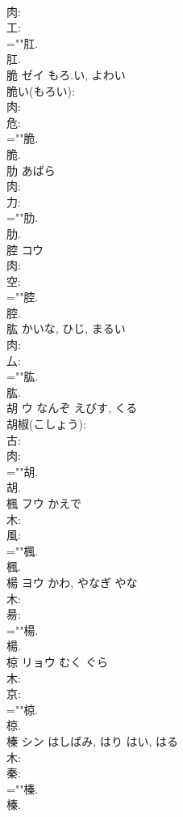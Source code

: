 \documentclass[8pt]{extreport}
\begin{document}
\begin{CJK}{UTF8}{min}
\\	肉: 
\\	工: 
\\	=""肛.
\\	肛.
\\	脆	ゼイ	もろ.い, よわい		
\\	脆い(もろい): 
\\	肉: 
\\	危: 
\\	=""脆.
\\	脆.
\\	肋		あばら				
\\	肉: 
\\	力: 
\\	=""肋.
\\	肋.
\\	腔	コウ			
\\	肉: 
\\	空: 
\\	=""腔.
\\	腔.
\\	肱		かいな, ひじ, まるい				
\\	肉: 
\\	厶: 
\\	=""肱.
\\	肱.
\\	胡	ウ	なんぞ	えびす, くる	
\\	胡椒(こしょう): 
\\	古: 
\\	肉: 
\\	=""胡.
\\	胡.
\\	楓	フウ	かえで		
\\	木: 
\\	風: 
\\	=""楓.
\\	楓.
\\	楊	ヨウ	かわ, やなぎ	やな	
\\	木: 
\\	昜: 
\\	=""楊.
\\	楊.
\\	椋	リョウ	むく	ぐら	
\\	木: 
\\	京: 
\\	=""椋.
\\	椋.
\\	榛	シン	はしばみ, はり	はい, はる	
\\	木: 
\\	秦: 
\\	=""榛.
\\	榛.

\end{CJK}
\end{document}
